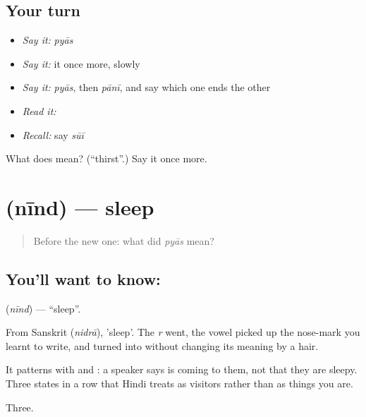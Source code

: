 \subsection*{Your turn}
\begin{itemize}
\raggedright
  \item \emph{Say it:} \emph{pyās}
  \item \emph{Say it:} it once more, slowly
  \item \emph{Say it:} \emph{pyās}, then \emph{pānī}, and say which one ends the other
  \item \emph{Read it:} \textbf{}
  \item \emph{Recall:} say \emph{sūī}
\end{itemize}

\begin{tcolorbox}[breakable,colback=teal!4,colframe=teal!35!black,title={Before you move on}]
What does  mean? (\textquotedblleft{}thirst\textquotedblright{}.) Say it once more.
\end{tcolorbox}
\section[\texorpdfstring{\hi{नींद} (nīnd)}{नींद (nīnd)}]{ (nīnd) — sleep}

\label{lesson:HI-C63-sleep}



\begin{quote}
Before the new one: what did \emph{pyās} mean?
\end{quote}

\subsection*{You'll want to know: }
\textbf{} (\emph{nīnd}) — \textquotedblleft{}sleep\textquotedblright{}.

From Sanskrit  (\emph{nidrā}), 'sleep'. The \emph{r} went, the vowel picked up the nose-mark you learnt to write, and  turned into  without changing its meaning by a hair.

It patterns with  and : a speaker says  is coming to them, not that they are sleepy. Three states in a row that Hindi treats as visitors rather than as things you are.

\begin{grammarlens}[title={What you've built}]
Three.
\end{grammarlens}

